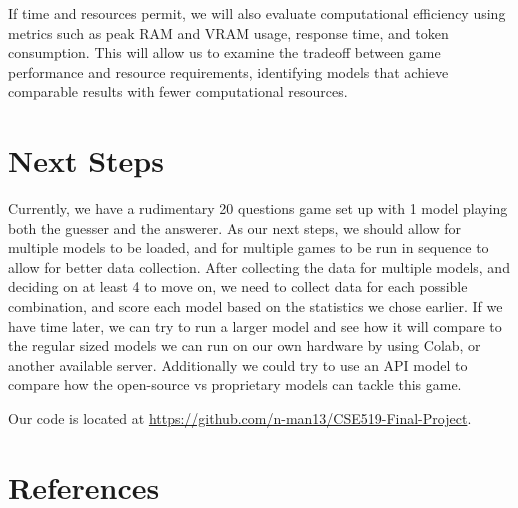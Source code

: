 \documentclass[10pt]{article}
\begin{document}
If time and resources permit, we will also evaluate computational efficiency
using metrics such as peak RAM and VRAM usage, response time, and token
consumption. This will allow us to examine the tradeoff between game
performance and resource requirements, identifying models that achieve
comparable results with fewer computational resources.

\section{Next Steps}

Currently, we have a rudimentary 20 questions game set up with 1 model
playing both the guesser and the answerer. As our next steps, we should allow
for multiple models to be loaded, and for multiple games to be run in sequence
to allow for better data collection. After collecting the data for multiple
models, and deciding on at least 4 to move on, we need to collect data for
each possible combination, and score each model based on the statistics we
chose earlier. If we have time later, we can try to run a larger model and see
how it will compare to the regular sized models we can run on our own hardware
by using Colab, or another available server. Additionally we could try to use
an API model to compare how the open-source vs proprietary models can tackle
this game.

Our code is located at
\url{https://github.com/n-man13/CSE519-Final-Project}.

\section{References}
\end{document}
